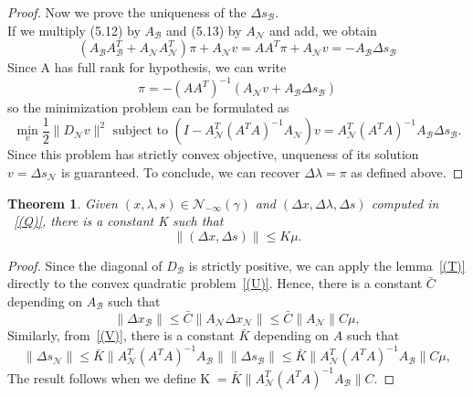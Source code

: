 \documentclass[a4paper,10 pt,titlepage,twoside]{book}
\theoremstyle{plain}
\newtheorem{thm}{Theorem}[chapter]
\theoremstyle{definition}
\theoremstyle{remark}
\begin{document}
\begin{proof}
	 Now we prove the uniqueness of the $\Delta s_{\mathcal{B}}$.\\
	 If we multiply (5.12) by $A_{\mathcal{B}}$ and (5.13) by $A_{\mathcal{N}}$ and add, we obtain
	 \begin{equation*}
	 (A_{\mathcal{B}}A_{\mathcal{B}}^{T}+A_{\mathcal{N}}A_{\mathcal{N}}^{T})\pi+A_{\mathcal{N}}v = AA^{T}\pi+A_{\mathcal{N}}v = -A_{\mathcal{B}}\Delta s_{\mathcal{B}}
	 \end{equation*} 
	 Since A has full rank for hypothesis, we can write
	 \begin{equation*}
	 \pi = -(AA^{T})^{-1}(A_{\mathcal{N}}v +A_{\mathcal{B}}\Delta s_{\mathcal{B}})
	 \end{equation*}
	 so the minimization problem can be formulated as
	 	\begin{equation}\label{(V)}
	 \min\limits_{v}\frac{1}{2}\lVert D_{\mathcal{N}}v\rVert^{2} \text{ subject to }
	 (I-A_{\mathcal{N}}^{T}(A^{T}A)^{-1}A_{\mathcal{N}})v =A_{\mathcal{N}}^{T}(A^{T}A)^{-1}A_{\mathcal{B}}\Delta s_{\mathcal{B}}.		 
	 \end{equation}
	 Since this problem  has strictly convex objective, unqueness of its solution $v=\Delta s_{\mathcal{N}}$ is guaranteed. To conclude, we can recover $\Delta \lambda=\pi$ as defined above. 
\end{proof}
\begin{thm}
	Given $(x, \lambda, s)\in\mathcal{N}_{- \infty}(\gamma)$ and $(\Delta x,\Delta \lambda, \Delta s)$ computed in ~\ref{(Q)}, there is a constant K such that
	\begin{equation*}
	\lVert (\Delta x, \Delta s)\rVert \leq K \mu.
	\end{equation*}
\end{thm}
\begin{proof}
	Since the diagonal of $D_{\mathcal{B}}$ is strictly positive, we can apply the lemma~\ref{(T)} directly to the convex quadratic problem~\ref{(U)}. Hence, there is a constant $\bar{C}$ depending on $A_{\mathcal{B}}$ such that
	\begin{equation}
	\lVert \Delta x_{\mathcal{B}}\rVert \leq \bar{C}\lVert A_{\mathcal{N}}\Delta x_{\mathcal{N}}\rVert\leq \bar{C}\lVert A_{\mathcal{N}}\rVert C\mu,
	\end{equation}
	Similarly, from~\ref{(V)}, there is a constant $\bar{K}$ depending on $A$ such that
		\begin{equation}
	\lVert \Delta s_{\mathcal{N}}\rVert \leq \bar{K}\lVert A_{\mathcal{N}}^{T}(A^{T}A)^{-1}A_{\mathcal{B}}\rVert\lVert \Delta s_{\mathcal{B}}\rVert \leq\bar{K} \lVert A_{\mathcal{N}}^{T}(A^{T}A)^{-1}A_{\mathcal{B}}\rVert C\mu,
	\end{equation}
	The result follows when we define K$\;=\bar{K} \lVert A_{\mathcal{N}}^{T}(A^{T}A)^{-1}A_{\mathcal{B}}\rVert C$.
\end{proof}
\end{document}
